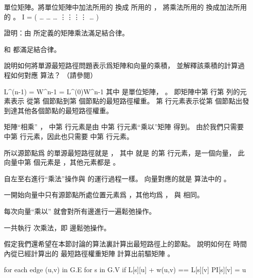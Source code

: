 \startANSWER
單位矩陣。將單位矩陣中加法所用的  換成 \m{\min} 所用的 \m{\infty}，
將乘法所用的  換成加法所用的 。
\startformula
I = \left(\startmatrix
{}   \NC \ldots {} \NR
{}   \NC \ldots {} \NR
{}   \NC \ldots {} \NR
\NC \vdots \NC \vdots \NC \vdots \NC \ddots \NC \vdots \NR
{}   \NC \ldots {} \NR
\stopmatrix\right)
\stopformula
\stopANSWER

\startEXERCISE
證明：由  所定義的矩陣乘法滿足結合律。
\stopEXERCISE

\startANSWER
\m{\min} 和 \m{+} 都滿足結合律。
\stopANSWER

\startEXERCISE
說明如何將單源最短路徑問題表示爲矩陣和向量的乘積，
並解釋該乘積的計算過程如何對應  算法？
（請參閱\insection[24.1]）
\stopEXERCISE

\startANSWER
\startformula
L^{(n-1)} = W^{n-1} = L^{(0)}\cdot W^{n-1}
\stopformula
其中  是單位矩陣， 。
即矩陣中第  行第  列的元素表示
從第  個節點到第  個節點的最短路徑權重。
第  行元素表示從第  個節點出發到達其他各個節點的最短路徑權重。

矩陣“相乘” ，
  中第  行元素是由  中第  行元素“乘以”矩陣  得到。
由於我們只需要  中第  行元素，因此也只需要  中第  行元素。

所以源節點爲  的單源最短路徑就是 ，
其中  就是  的第  行元素，是一個向量，
此向量中第  個元素是 ，其他元素都是 \m{\infty}。

自左至右進行“乘法”操作與  的運行過程一樣。
向量對應的就是  算法中的 。

\startigBase[2]
\item 一開始向量中只有源節點所處位置元素爲 ，其他均爲 \m{\infty}，
與  相同。
\item 每次向量“乘以”  就會對所有邊進行一遍鬆弛操作。
\item 一共執行  次乘法，即  邊鬆弛操作。
\stopigBase
\stopANSWER

\startEXERCISE
假定我們還希望在本節討論的算法裏計算出最短路徑上的節點。
說明如何在  時間內從已經計算出的
最短路徑權重矩陣  計算出前驅矩陣 \m{\prod}。
\stopEXERCISE

\startANSWER
\startCLRS
for each edge (u,v) in G.E
	for s in G.V
		if L[s][u] + w(u,v) == L[s][v]
			PI[s][v] = u
\stopCLRS
\stopANSWER

